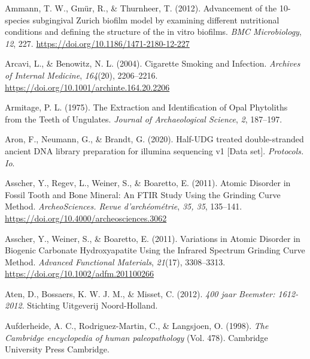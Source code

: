 \documentclass[
  letterpaper,
]{book}
\newlength{\cslhangindent}
\newlength{\cslentryspacingunit} %
\newenvironment{CSLReferences}[2] %
 {%
  \setlength{\parindent}{0pt}
  \ifodd #1
  \let\oldpar\par
  \def\par{\hangindent=\cslhangindent\oldpar}
  \fi
  \setlength{\parskip}{#2\cslentryspacingunit}
 }%
 {}
\begin{document}
\begin{CSLReferences}{1}{0}
\leavevmode{}%
Ammann, T. W., Gmür, R., \& Thurnheer, T. (2012). Advancement of the
10-species subgingival {Zurich} biofilm model by examining different
nutritional conditions and defining the structure of the in vitro
biofilms. \emph{BMC Microbiology}, \emph{12}, 227.
\url{https://doi.org/10.1186/1471-2180-12-227}

\leavevmode{}%
Arcavi, L., \& Benowitz, N. L. (2004). Cigarette {Smoking} and
{Infection}. \emph{Archives of Internal Medicine}, \emph{164}(20),
2206--2216. \url{https://doi.org/10.1001/archinte.164.20.2206}

\leavevmode{}%
Armitage, P. L. (1975). The {Extraction} and {Identification} of {Opal
Phytoliths} from the {Teeth} of {Ungulates}. \emph{Journal of
Archaeological Science}, \emph{2}, 187--197.

\leavevmode{}%
Aron, F., Neumann, G., \& Brandt, G. (2020). Half-{UDG} treated
double-stranded ancient {DNA} library preparation for illumina
sequencing v1 {[}{Data} set{]}. \emph{Protocols. Io}.

\leavevmode{}%
Asscher, Y., Regev, L., Weiner, S., \& Boaretto, E. (2011). Atomic
{Disorder} in {Fossil Tooth} and {Bone Mineral}: {An FTIR Study Using}
the {Grinding Curve Method}. \emph{ArcheoSciences. Revue
d'archéométrie}, \emph{35, 35}, 135--141.
\url{https://doi.org/10.4000/archeosciences.3062}

\leavevmode{}%
Asscher, Y., Weiner, S., \& Boaretto, E. (2011). Variations in {Atomic
Disorder} in {Biogenic Carbonate Hydroxyapatite Using} the {Infrared
Spectrum Grinding Curve Method}. \emph{Advanced Functional Materials},
\emph{21}(17), 3308--3313. \url{https://doi.org/10.1002/adfm.201100266}

\leavevmode{}%
Aten, D., Bossaers, K. W. J. M., \& Misset, C. (2012). \emph{400 jaar
Beemster: 1612-2012}. {Stichting Uitgeverij Noord-Holland}.

\leavevmode{}%
Aufderheide, A. C., Rodriguez-Martin, C., \& Langsjoen, O. (1998).
\emph{The {Cambridge} encyclopedia of human paleopathology} (Vol. 478).
{Cambridge University Press Cambridge}.


\end{CSLReferences}
\end{document}
